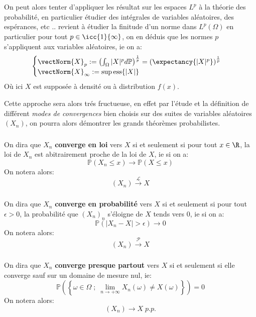 \chapter*{} %
On peut alors tenter d'appliquer les résultat sur les espaces \( L^p \) à la théorie des probabilité, en particulier étudier des intégrales de variables aléatoires, des espérances, etc .. revient à étudier la finitude d'un norme dans \(L^p(\Omega)\) en particulier pour tout \( p \in \icc{1}{\infty} \), on en déduis que les normes \( p \) s'appliquent aux variables aléatoires, ie on a:
\[ 
   \begin{cases}
      \vectNorm{X}_p := \left(\int_\Omega |X|^p d \mathbb{P} \right)^{ \frac{1}{p}} = \left( \expectancy{|X|^p} \right)^{ \frac{1}{p}}\\
      \vectNorm{X}_\infty := \sup\text{ess} \{ |X| \}

   \end{cases}
\]
Où ici \( X \) est supposée à densité ou à distribution \( f(x) \).\<

Cette approche sera alors trés fructueuse, en effet par l'étude et la définition de différent \textit{modes de convergences} bien choisis sur des suites de variables aléatoires \( (X_n) \), on pourra alors démontrer les grands théorèmes probabilistes.
\subsection*{}
On dira que \(X_n\) \textbf{converge en loi} vers \(X\) si et seulement si pour tout \(x \in \R\), la loi de \( X_n \) est abitrairement proche de la loi de \( X \), ie si on a:
\[
   \mathbb{P}(X_n \leq x) \longrightarrow \mathbb{P}(X \leq x)
\]
On notera alors:
\[
   (X_n) \overset{\mathcal{L}}{\longrightarrow} X
\]
\subsection*{}
On dira que \(X_n\) \textbf{converge en probabilité} vers \(X\) si et seulement si pour tout \(\epsilon > 0\), la probabilité que \( (X_n)_n \) s'éloigne de \( X \) tends vers 0, ie si on a:
\[
   \mathbb{P}(|X_n - X| > \epsilon) \longrightarrow 0
\]
On notera alors:
\[
   (X_n) \overset{\mathcal{P}}{\longrightarrow} X
\]
\subsection*{}
On dira que \(X_n\) \textbf{converge presque partout} vers \(X\) si et seulement si elle converge sauf sur un domaine de mesure nul, ie:
\[
   \mathbb{P}\left( \left\{ \omega \in \Omega \; ; \; \lim_{n \rightarrow +\infty} X_n(\omega) \neq X(\omega) \right\}\right) = 0
\]
On notera alors:
\[
   (X_n) \longrightarrow X \; p.p.
\]
